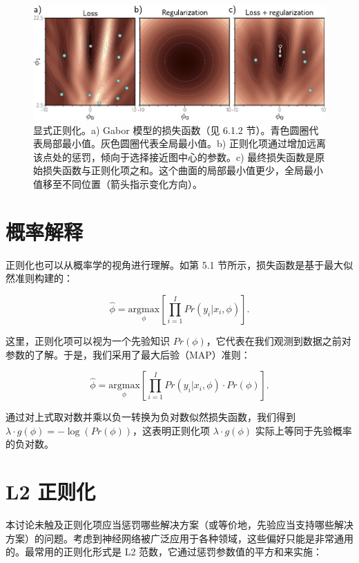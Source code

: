 \documentclass[lang=cn,newtx,10pt,scheme=chinese]{elegantbook}
\begin{document}
\begin{figure}[ht!]
	\centering
	\includegraphics[width=0.7\linewidth]{PDFFigures/UDLChap9PDF/RegExplicitTheory.pdf}
	\caption{显式正则化。a) Gabor 模型的损失函数（见 6.1.2 节）。青色圆圈代表局部最小值。灰色圆圈代表全局最小值。b) 正则化项通过增加远离该点处的惩罚，倾向于选择接近图中心的参数。c) 最终损失函数是原始损失函数与正则化项之和。这个曲面的局部最小值更少，全局最小值移至不同位置（箭头指示变化方向）。}
\end{figure}


\section{概率解释}

正则化也可以从概率学的视角进行理解。如第 5.1 节所示，损失函数是基于最大似然准则构建的：

\begin{equation}
\hat{\phi} = \underset{\phi}{\mathrm{argmax}} \left[ \prod_{i=1}^I Pr(y_i | x_i, \phi) \right]. 
\end{equation}

这里，正则化项可以视为一个先验知识 \(Pr(\phi)\)，它代表在我们观测到数据之前对参数的了解。于是，我们采用了最大后验（MAP）准则：

\begin{equation}
\hat{\phi} = \underset{\phi}{\mathrm{argmax}} \left[ \prod_{i=1}^I Pr(y_i | x_i, \phi) \cdot Pr(\phi) \right]. 
\end{equation}

通过对上式取对数并乘以负一转换为负对数似然损失函数，我们得到 \(\lambda \cdot g(\phi) = -\log(Pr(\phi))\)，这表明正则化项 \(\lambda \cdot g(\phi)\) 实际上等同于先验概率的负对数。

\section{L2 正则化}

本讨论未触及正则化项应当惩罚哪些解决方案（或等价地，先验应当支持哪些解决方案）的问题。考虑到神经网络被广泛应用于各种领域，这些偏好只能是非常通用的。最常用的正则化形式是 L2 范数，它通过惩罚参数值的平方和来实施：
\end{document}
